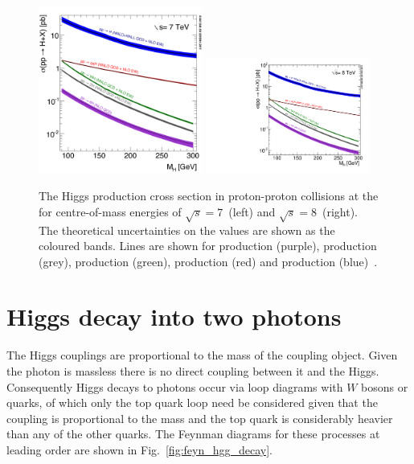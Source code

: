 \begin{figure}
  \includegraphics[width=0.48\textwidth]{theory/plots/Higgs_XS_7TeV_LM}
  \includegraphics[width=0.48\textwidth]{theory/plots/Higgs_XS_8TeV_LM}
  \caption[\acs{SM} Higgs production cross section at the \acs{LHC}]{The \SM Higgs production cross section in proton-proton collisions at the \LHC for centre-of-mass energies of $\sqrt{s}=7$~\TeV (left) and $\sqrt{s}=8$~\TeV (right). The theoretical uncertainties on the values are shown as the coloured bands. Lines are shown for \ttH production (purple), \ZH production (grey), \WH production (green), \VBF production (red) and \ggH production (blue)~\cite{LHCHiggsCrossSectionWorkingGroup3}.}
  \label{fig:higgs_xs}
\end{figure}

\section{Higgs decay into two photons}

The Higgs couplings are proportional to the mass of the coupling object. Given the photon is massless there is no direct coupling between it and the Higgs. Consequently Higgs decays to photons occur via loop diagrams with $W$ bosons or quarks, of which only the top quark loop need be considered given that the coupling is proportional to the mass and the top quark is considerably heavier than any of the other quarks. The Feynman diagrams for these processes at leading order are shown in Fig.~\ref{fig:feyn_hgg_decay}.

